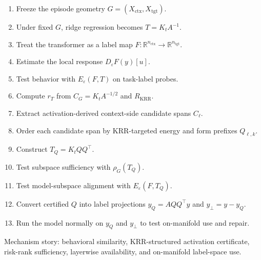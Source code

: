 \documentclass[11pt]{article}
\newcommand{\R}{\mathbb{R}}
\begin{document}
\begin{enumerate}[label=\arabic*.]
\item Freeze the episode geometry \(G=(X_{\mathrm{ctx}},X_{\mathrm{tgt}})\).
\item Under fixed \(G\), ridge regression becomes \(T=K_tA^{-1}\).
\item Treat the transformer as a label map \(F:\R^{n_{\mathrm{ctx}}}\to\R^{n_{\mathrm{tgt}}}\).
\item Estimate the local response \(D_\varepsilon F(y)[u]\).
\item Test behavior with \(E_\varepsilon(F,T)\) on task-label probes.
\item Compute \(r_T\) from \(C_G=K_tA^{-1/2}\) and \(R_{\mathrm{KRR}}\).
\item Extract activation-derived context-side candidate spans \(C_\ell\).
\item Order each candidate span by KRR-targeted energy and form prefixes \(Q_{\ell,k}\).
\item Construct \(T_Q=K_tQQ^\top\).
\item Test subspace sufficiency with \(\rho_G(T_Q)\).
\item Test model-subspace alignment with \(E_\varepsilon(F,T_Q)\).
\item Convert certified \(Q\) into label projections \(y_Q=AQQ^\top y\) and \(y_\perp=y-y_Q\).
\item Run the model normally on \(y_Q\) and \(y_\perp\) to test on-manifold use and repair.
\end{enumerate}

Mechanism story: behavioral similarity, KRR-structured activation certificate, risk-rank
sufficiency, layerwise availability, and on-manifold label-space use.
\end{document}
